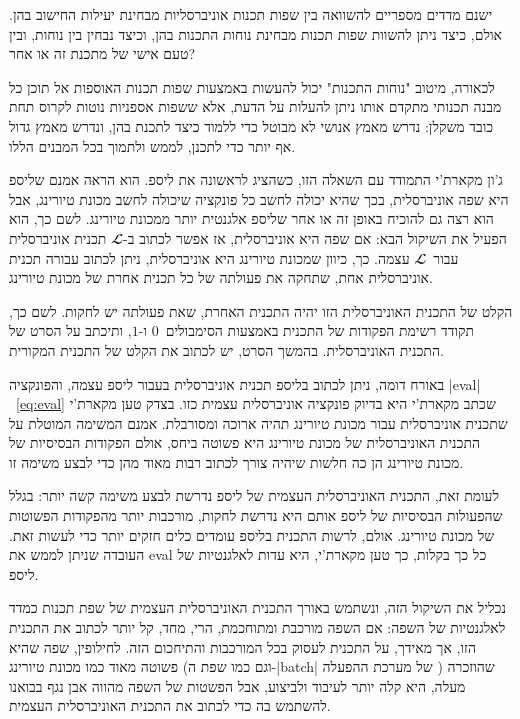 ישנם מדדים מספריים להשוואה בין שפות תכנות אוניברסליות מבחינת יעילות החישוב בהן.
אולם, כיצד ניתן להשוות שפות תכנות מבחינת נוחות התכנות בהן, וכיצד נבחין בין
נוחות, ובין טעם אישי של מתכנת זה או אחר?

לכאורה, מיטוב "נוחות התכנות" יכול להעשות באמצעות שפות תכנות האוספות אל תוכן כל
מבנה תכנותי מתקדם אותו ניתן להעלות על הדעת, אלא ששפות אספניות נוטות לקרוס תחת
כובד משקלן: נדרש מאמץ אנושי לא מבוטל כדי ללמוד כיצד לתכנת בהן, ונדרש מאמץ גדול
אף יותר כדי לתכנן, לממש ולתמוך בכל המבנים הללו.

ג'ון מקארת'י התמודד עם השאלה הזו, כשהציג לראשונה את ליספ. הוא הראה אמנם שליספ
היא שפה אוניברסלית, בכך שהיא יכולה לחשב כל פונקציה שיכולה לחשב מכונת טיורינג,
אבל הוא רצה גם להוכיח באופן זה או אחר שליספ אלגנטית יותר ממכונת טיורינג. לשם
כך, הוא הפעיל את השיקול הבא: אם שפה היא אוניברסלית, אז אפשר לכתוב ב-$𝓛$ תכנית
אוניברסלית עבור~$𝓛$ עצמה. כך, כיוון שמכונת טיורינג היא אוניברסלית, ניתן לכתוב
עבורה תכנית אוניברסלית אחת, שתחקה את פעולתה של כל תכנית אחרת של מכונת טיורינג.

הקלט של התכנית האוניברסלית הזו יהיה התכנית האחרת, שאת פעולתה יש לחקות. לשם כך,
תקודד רשימת הפקודות של התכנית באמצעות הסימבולים~$0$ ו-$1$, ותיכתב על הסרט של
התכנית האוניברסלית. בהמשך הסרט, יש לכתוב את הקלט של התכנית המקורית.

באורח דומה, ניתן לכתוב בליספ תכנית אוניברסלית בעבור ליספ עצמה, והפונקציה
\E|eval|~\ref{eq:eval} שכתב מקארת'י היא בדיוק פונקציה אוניברסלית עצמית כזו.
בצדק טען מקארת'י שתכנית אוניברסלית עבור מכונת טיורינג תהיה ארוכה ומסורבלת.
אמנם המשימה המוטלת על התכנית האוניברסלית של מכונת טיורינג היא פשוטה ביחס, אולם
הפקודות הבסיסיות של מכונת טיורינג הן כה חלשות שיהיה צורך לכתוב רבות מאוד מהן
כדי לבצע משימה זו.

לעומת זאת, התכנית האוניברסלית העצמית של ליספ נדרשת לבצע משימה קשה יותר: בגלל
שהפעולות הבסיסיות של ליספ אותם היא נדרשת לחקות, מורכבות יותר מהפקודות הפשוטות
של מכונת טיורינג. אולם, לרשות התכנית בליספ עומדים כלים חזקים יותר כדי לעשות
זאת. העובדה שניתן לממש את eval כל כך בקלות, כך טען מקארת'י, היא עדות לאלגנטיות
של ליספ.

נכליל את השיקול הזה, ונשתמש באורך התכנית האוניברסלית העצמית של שפת תכנות כמדד
לאלגנטיות של השפה: אם השפה מורכבת ומתוחכמת, הרי, מחד, קל יותר לכתוב את התכנית
הזו, אך מאידך, על התכנית לעסוק בכל המורכבות והתיחכום הזה. לחילופין, שפה שהיא
פשוטה מאוד כמו מכונת טיורינג (וגם כמו שפת ה-\E|batch| של מערכת ההפעלה )
שהוזכרה מעלה, היא קלה יותר לעיבוד ולביצוע, אבל הפשטות של השפה מהווה אבן נגף
בבואנו להשתמש בה כדי לכתוב את התכנית האוניברסלית העצמית.

